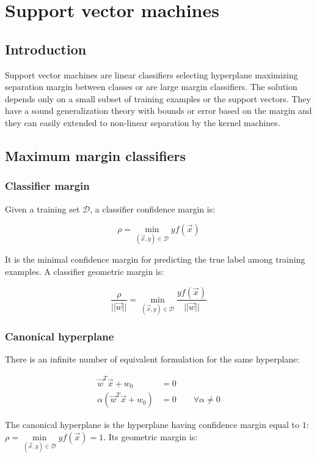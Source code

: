 \chapter{Support vector machines}

\section{Introduction}
Support vector machines are linear classifiers selecting hyperplane maximizing separation margin between classes or are large margin classifiers.
The solution depends only on a small subset of training examples or the support vectors.
They have a sound generalization theory with bounds or error based on the margin and they can easily extended to non-linear separation by the kernel machines.

\section{Maximum margin classifiers}

	\subsection{Classifier margin}
	Given a training set $\mathcal{D}$, a classifier confidence margin is:

	$$\rho = \min\limits_{(\vec{x},y)\in\mathcal{D}}yf(\vec{x})$$

	It is the minimal confidence margin for predicting the true label among training examples.
	A classifier geometric margin is:

	$$\frac{\rho}{||\vec{w}||} = \min\limits_{(\vec{x},y)\in\mathcal{D}}\frac{yf(\vec{x})}{||\vec{w}||}$$

	\subsection{Canonical hyperplane}
	There is an infinite number of equivalent formulation for the same hyperplane:

	\begin{align*}
		\vec{w}^T\vec{x}+w_0 &=0\\
		\alpha(\vec{w}^T\vec{x}+w_0) &= 0\qquad \forall\alpha\neq0
	\end{align*}

	The canonical hyperplane is the hyperplane having confidence margin equal to $1$: $\rho = \min\limits_{(\vec{x}, y)\in\mathcal{D}}yf(\vec{x}) = 1$.
	Its geometric margin is:

